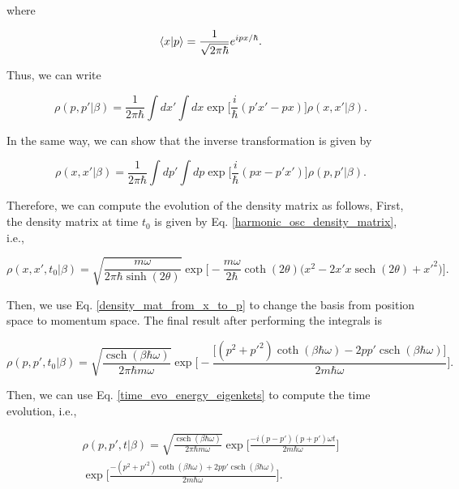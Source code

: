 \documentclass{article}
\DeclareMathOperator{\sech}{sech}
\DeclareMathOperator{\csch}{csch}
\begin{document}
where

\begin{equation}
    \braket{x|p} = \frac{1}{\sqrt{2\pi \hbar}} e^{i px/\hbar}.
\end{equation}

Thus, we can write

\begin{equation}\label{density_mat_from_x_to_p}
    \rho(p,p'|\beta) = \frac{1}{2\pi \hbar} \int dx' \int dx \exp \bigg[ \frac{i}{\hbar} (p'x'-px) \bigg] \rho(x,x'|\beta).
\end{equation}

In the same way, we can show that the inverse transformation is given by

\begin{equation}\label{density_mat_from_p_to_x}
    \rho(x,x'|\beta) = \frac{1}{2\pi \hbar} \int dp' \int dp \exp \bigg[ \frac{i}{\hbar} (px-p'x') \bigg] \rho(p,p'|\beta).
\end{equation}

Therefore, we can compute the evolution of the density matrix as follows, First, the density matrix at time $t_{0}$ is given by Eq. \ref{harmonic_osc_density_matrix}, i.e.,

\begin{equation}
    \rho(x, x', t_{0}|\beta) = \sqrt{\frac{m\omega}{2\pi \hbar \sinh(2\theta)}} \exp \Bigg[ - \frac{m\omega}{2\hbar} \coth(2\theta) \big( x^{2} - 2x' x \sech(2\theta) + x'^{2} \big) \Big].
\end{equation}

Then, we use Eq. \ref{density_mat_from_x_to_p} to change the basis from position space to momentum space. The final result after performing the integrals is

\begin{equation}
    \rho(p, p', t_{0}|\beta) = \sqrt{\frac{\csch(\beta \hbar \omega)}{2\pi \hbar m \omega}} \exp \bigg[ -\frac{\big[ (p^{2}+p'^{2})\coth(\beta \hbar \omega) - 2pp'\csch(\beta \hbar \omega) \big]}{2m\hbar \omega} \bigg].
\end{equation}

Then, we can use Eq. \ref{time_evo_energy_eigenkets} to compute the time evolution, i.e.,

\begin{multline}
    \rho(p, p', t|\beta) = \sqrt{\frac{\csch(\beta \hbar \omega)}{2\pi \hbar m \omega}} \exp \bigg[ \frac{-i(p-p')(p+p')\omega t}{2m\hbar \omega} \bigg] \\ \exp \bigg[ \frac{ -(p^{2}+p'^{2})\coth(\beta \hbar \omega) + 2pp'\csch(\beta \hbar \omega) }{2m \hbar \omega} \bigg].
\end{multline}
\end{document}
